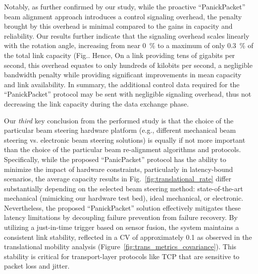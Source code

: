 \documentclass[fleqn,10pt]{wlscirep}
\begin{document}
Notably, as further confirmed by our study, while the proactive ``PanickPacket'' beam alignment approach introduces a control signaling overhead, the penalty brought by this overhead is minimal compared to the gains in capacity and reliability. Our results further indicate that the signaling overhead scales linearly with the rotation angle, increasing from near \SI{0}{\percent} to a maximum of only \SI{0.3}{\percent} of the total link capacity (Fig.. Hence, On a link providing tens of gigabits per second, this overhead equates to only hundreds of kilobits per second, a negligible bandwidth penalty while providing significant improvements in mean capacity and link availability. In summary, the additional control data required for the ``PanickPacket'' protocol may be sent with negligible signaling overhead, thus not decreasing the link capacity during the data exchange phase.

Our \emph{third} key conclusion from the performed study is that the choice of the particular beam steering hardware platform (e.g., different mechanical beam steering vs. electronic beam steering solutions) is equally if not more important than the choice of the particular beam re-alignment algorithms and protocols. Specifically, while the proposed ``PanicPacket'' protocol has the ability to minimize the impact of hardware constraints, particularly in latency-bound scenarios, the average capacity results in Fig.~\ref{fig:translational_rate} differ substantially depending on the selected beam steering method: state-of-the-art mechanical (mimicking our hardware test bed), ideal mechanical, or electronic. Nevertheless, the proposed ``PanickPacket'' solution effectively mitigates these latency limitations by decoupling failure prevention from failure recovery. By utilizing a just-in-time trigger based on sensor fusion, the system maintains a consistent link stability, reflected in a CV of approximately 0.1 as observed in the translational mobility analysis (Figure~\ref{fig:trans_metrics_covariance}). This stability is critical for transport-layer protocols like TCP that are sensitive to packet loss and jitter. 
\end{document}
